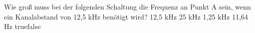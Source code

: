    {Wie groß muss bei der folgenden Schaltung die Frequenz an Punkt A sein, wenn ein Kanalabstand von 12,5 kHz benötigt wird?}
    {12,5 kHz}
    {25 kHz}
    {1,25 kHz}
    {11,64 Hz}
    {true}{false}